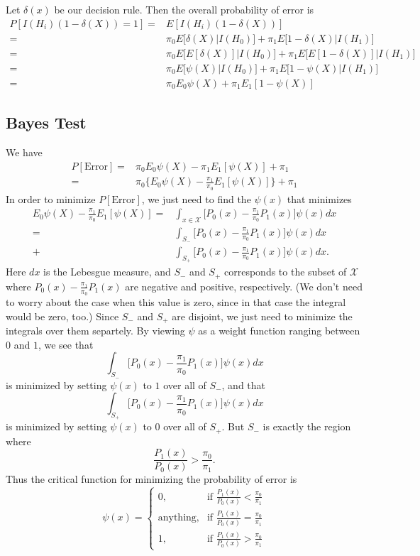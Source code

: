 \documentclass[12pt]{article}
\begin{document}
Let $\delta(x)$ be our decision rule.
Then the overall probability of error is
\begin{align*}
  P[I(H_i)(1-\delta(X))=1]
  = &E[I(H_i)(1-\delta(X))] \\
  = & \pi_0 E\Big[\delta(X) \Big| I(H_0)\Big] + \pi_1 E\Big[1-\delta(X) \Big| I(H_1)\Big] \\
  = & \pi_0 E\Big[E[\delta(X)] \Big| I(H_0)\Big] + \pi_1 E\Big[E[1-\delta(X)] \Big| I(H_1)\Big] \\
  = & \pi_0 E\Big[\psi(X) \Big| I(H_0)\Big] + \pi_1 E\Big[1-\psi(X) \Big| I(H_1)\Big] \\
  = & \pi_0 E_0 \psi(X) + \pi_1 E_1 [1 - \psi(X)]
\end{align*}

\subsection{Bayes Test}

We have
\begin{align*}
  P[\text{Error}]
  = & \pi_0 E_0 \psi(X) - \pi_1 E_1 [\psi(X)] + \pi_1 \\
  = & \pi_0 \Big\{E_0 \psi(X) - \frac{\pi_1}{\pi_0} E_1 [\psi(X)] \Big\} + \pi_1
\end{align*}
In order to minimize $P[\text{Error}]$,
we just need to find the $\psi(x)$ that minimizes
\begin{align*}
  E_0 \psi(X) - \frac{\pi_1}{\pi_0} E_1 [\psi(X)]
  = & \int_{x \in \mathcal{X}} \Big[P_0(x) - \frac{\pi_1}{\pi_0} P_1(x)\Big] \psi(x) dx \\
  = & \int_{S_-} \Big[P_0(x) - \frac{\pi_1}{\pi_0} P_1(x)\Big] \psi(x) dx \\
  + & \int_{S_+} \Big[P_0(x) - \frac{\pi_1}{\pi_0} P_1(x)\Big] \psi(x) dx. 
\end{align*}
Here $dx$ is the Lebesgue measure,
and $S_-$ and $S_+$ corresponds to the subset of $\mathcal{X}$
where $P_0(x) - \frac{\pi_1}{\pi_0} P_1(x)$ are negative and positive, respectively.
(We don't need to worry about the case when this value is zero,
since in that case the integral would be zero, too.)
Since $S_-$ and $S_+$ are disjoint,
we just need to minimize the integrals over them separtely.
By viewing $\psi$ as a weight function ranging between $0$ and $1$,
we see that
\[
  \int_{S_-} \Big[P_0(x) - \frac{\pi_1}{\pi_0} P_1(x)\Big] \psi(x) dx
\]
is minimized by setting $\psi(x)$ to $1$ over all of $S_-$,
and that
\[
  \int_{S_+} \Big[P_0(x) - \frac{\pi_1}{\pi_0} P_1(x)\Big] \psi(x) dx
\]
is minimized by setting $\psi(x)$ to $0$ over all of $S_+$.
But $S_-$ is exactly the region where
\[
  \frac{P_1(x)}{P_0(x)} > \frac{\pi_0}{\pi_1}.
\]
Thus the critical function for minimizing the probability of error is
\[
  \psi(x) =
  \left.
    \begin{cases}
      0, & \text{if  } \frac{P_1(x)}{P_0(x)} < \frac{\pi_0}{\pi_1} \\
      \text{anything}, & \text{if  } \frac{P_1(x)}{P_0(x)} = \frac{\pi_0}{\pi_1} \\
      1, & \text{if  } \frac{P_1(x)}{P_0(x)} > \frac{\pi_0}{\pi_1} 
    \end{cases} 
  \right.
\]
\end{document}
